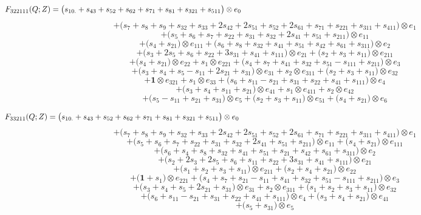 \documentclass[12pt]{amsart}
\theoremstyle{plain}
\theoremstyle{definition}
\theoremstyle{remark}
\begin{document}
$$F_{ 322111 }(Q;Z)=
\big( s_{10.} + s_{43} + s_{52} + s_{62} + s_{71} + s_{81} + s_{321} + s_{511} \big) \otimes e_{ 0 }  \hskip 5in \  $$ $$
+\big( s_{7} + s_{8} + s_{9} + s_{32} + s_{33} + 2 s_{42} + 2 s_{51} + s_{52} + 2 s_{61} + s_{71} + s_{221} + s_{311} + s_{411} \big) \otimes e_{ 1 } $$ $$
+\big( s_{5} + s_{6} + s_{7} + s_{22} + s_{31} + s_{32} + 2 s_{41} + s_{51} + s_{211} \big) \otimes e_{ 11 } $$ $$
+\big( s_{4} + s_{21} \big) \otimes e_{ 111 }
+\big( s_{6} + s_{8} + s_{32} + s_{41} + s_{51} + s_{42} + s_{61} + s_{311} \big) \otimes e_{ 2 } $$ $$
+\big( s_{3} + 2 s_{5} + s_{6} + s_{22} + 3 s_{31} + s_{41} + s_{111} \big) \otimes e_{ 21 }
+\big( s_{2} + s_{3} + s_{11} \big) \otimes e_{ 211 } $$ $$
+\big( s_{4} + s_{21} \big) \otimes e_{ 22 }
+ s_{1} \otimes e_{ 221 }
+\big( s_{4} + s_{7} + s_{41} + s_{32} + s_{51} - s_{111} + s_{211} \big) \otimes e_{ 3 } $$ $$
+\big( s_{3} + s_{4} + s_{5} - s_{11} + 2 s_{21} + s_{31} \big) \otimes e_{ 31 }
+ s_{2} \otimes e_{ 311 }
+\big( s_{2} + s_{3} + s_{11} \big) \otimes e_{ 32 } $$ $$
+ \boldsymbol{1} \otimes e_{ 321 }
+ s_{1} \otimes e_{ 33 }
+\big( s_{6} + s_{11} - s_{21} + s_{31} + s_{22} + s_{41} + s_{111} \big) \otimes e_{ 4 } $$ $$
+\big( s_{3} + s_{4} + s_{11} + s_{21} \big) \otimes e_{ 41 }
+ s_{1} \otimes e_{ 411 }
+ s_{2} \otimes e_{ 42 } $$ $$
+\big( s_{5} - s_{11} + s_{21} + s_{31} \big) \otimes e_{ 5 }
+\big( s_{2} + s_{3} + s_{11} \big) \otimes e_{ 51 }
+\big( s_{4} + s_{21} \big) \otimes e_{ 6 }
$$

$$F_{ 33211 }(Q;Z)=
\big( s_{10.} + s_{43} + s_{52} + s_{62} + s_{71} + s_{81} + s_{321} + s_{511} \big) \otimes e_{ 0 }  \hskip 5in \   $$ $$
+\big( s_{7} + s_{8} + s_{9} + s_{32} + s_{33} + 2 s_{42} + 2 s_{51} + s_{52} + 2 s_{61} + s_{71} + s_{221} + s_{311} + s_{411} \big) \otimes e_{ 1 } $$ $$
+\big( s_{5} + s_{6} + s_{7} + s_{22} + s_{31} + s_{32} + 2 s_{41} + s_{51} + s_{211} \big) \otimes e_{ 11 }
+\big( s_{4} + s_{21} \big) \otimes e_{ 111 } $$ $$
+\big( s_{6} + s_{4} + s_{8} + s_{32} + s_{41} + s_{51} + s_{21} + s_{42} + s_{61} + s_{311} \big) \otimes e_{ 2 } $$ $$
+\big( s_{2} + 2 s_{3} + 2 s_{5} + s_{6} + s_{11} + s_{22} + 3 s_{31} + s_{41} + s_{111} \big) \otimes e_{ 21 } $$ $$
+\big( s_{1} + s_{2} + s_{3} + s_{11} \big) \otimes e_{ 211 }
+\big( s_{2} + s_{4} + s_{21} \big) \otimes e_{ 22 } $$ $$
+\big( \boldsymbol{1} + s_{1} \big) \otimes e_{ 221 }
+\big( s_{4} + s_{7} + s_{21} - s_{11} + s_{41} + s_{32} + s_{51} - s_{111} + s_{211} \big) \otimes e_{ 3 } $$ $$
+\big( s_{3} + s_{4} + s_{5} + 2 s_{21} + s_{31} \big) \otimes e_{ 31 }
+ s_{2} \otimes e_{ 311 }
+\big( s_{1} + s_{2} + s_{3} + s_{11} \big) \otimes e_{ 32 } $$ $$
+\big( s_{6} + s_{11} - s_{21} + s_{31} + s_{22} + s_{41} + s_{111} \big) \otimes e_{ 4 }
+\big( s_{3} + s_{4} + s_{21} \big) \otimes e_{ 41 } $$ $$
+\big( s_{5} + s_{31} \big) \otimes e_{ 5 }
$$
\end{document}
